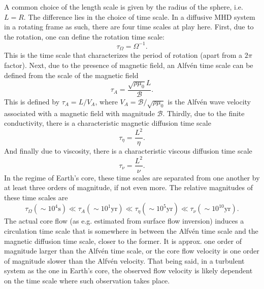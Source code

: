 A common choice of the length scale is given by the radius of the sphere, i.e. $L = R$. The difference lies in the choice of time scale. In a diffusive MHD system in a rotating frame as such, there are four time scales at play here. First, due to the rotation, one can define the rotation time scale:
\[
    \tau_\Omega = \Omega^{-1}.
\]
This is the time scale that characterizes the period of rotation (apart from a $2\pi$ factor). Next, due to the presence of magnetic field, an Alfvén time scale can be defined from the scale of the magnetic field
\[
    \tau_A = \frac{\sqrt{\rho \mu_0} L}{\mathscr{B}}.
\]
This is defined by $\tau_A = L/V_A$, where $V_A = \mathscr{B}/\sqrt{\rho \mu_0}$ is the Alfvén wave velocity associated with a magnetic field with magnitude $\mathscr{B}$.
Thirdly, due to the finite conductivity, there is a characteristic magnetic diffusion time scale
\[
    \tau_\eta = \frac{L^2}{\eta}.
\]
And finally due to viscosity, there is a characteristic viscous diffusion time scale
\[
    \tau_\nu = \frac{L^2}{\nu}.
\]
In the regime of Earth's core, these time scales are separated from one another by at least three orders of magnitude, if not even more. The relative magnitudes of these time scales are 
\begin{equation}
    \tau_\Omega \left(\sim 10^4 \mathrm{s}\right) \ll \tau_A \left(\sim 10^1 \mathrm{yr}\right) \ll \tau_\eta \left(\sim 10^5 \mathrm{yr}\right) \ll \tau_\nu \left(\sim 10^{10} \mathrm{yr}\right).
\end{equation}
The actual core flow (as e.g. estimated from surface flow inversion) induces a circulation time scale that is somewhere in between the Alfvén time scale and the magnetic diffusion time scale, closer to the former. It is approx. one order of magnitude larger than the Alfvén time scale, or the core flow velocity is one order of magnitude slower than the Alfvén velocity. That being said, in a turbulent system as the one in Earth's core, the observed flow velocity is likely dependent on the time scale where such observation takes place.

